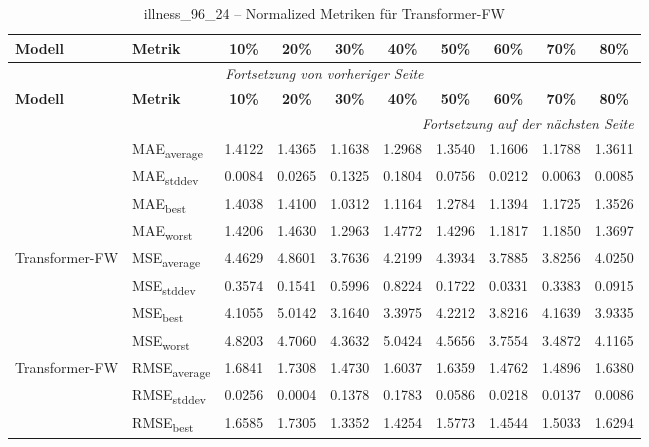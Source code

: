 {\small
\begin{longtable}{l l c c c c c c c c}
    \toprule
    \textbf{Modell} & \textbf{Metrik} & \textbf{10\%} & \textbf{20\%} & \textbf{30\%} & \textbf{40\%} & \textbf{50\%} & \textbf{60\%} & \textbf{70\%} & \textbf{80\%} \\
    \midrule
    \endfirsthead
    \multicolumn{10}{c}{\textit{Fortsetzung von vorheriger Seite}} \\
    \toprule
    \textbf{Modell} & \textbf{Metrik} & \textbf{10\%} & \textbf{20\%} & \textbf{30\%} & \textbf{40\%} & \textbf{50\%} & \textbf{60\%} & \textbf{70\%} & \textbf{80\%} \\
    \midrule
    \endhead
    \midrule
    \multicolumn{10}{r}{\textit{Fortsetzung auf der nächsten Seite}} \\
    \midrule
    \endfoot
    \bottomrule
    \caption{illness_96_24 -- Normalized Metriken für Transformer-FW}
    \label{tab:illness_96_24_normalized_transformer-fw}
    \endlastfoot
\multirow{4}{*}{Transformer-FW} & MAE\textsubscript{average} & 1.4122 & 1.4365 & 1.1638 & 1.2968 & 1.3540 & 1.1606 & 1.1788 & 1.3611 \\
 & MAE\textsubscript{stddev} & 0.0084 & 0.0265 & 0.1325 & 0.1804 & 0.0756 & 0.0212 & 0.0063 & 0.0085 \\
 & MAE\textsubscript{best} & 1.4038 & 1.4100 & 1.0312 & 1.1164 & 1.2784 & 1.1394 & 1.1725 & 1.3526 \\
 & MAE\textsubscript{worst} & 1.4206 & 1.4630 & 1.2963 & 1.4772 & 1.4296 & 1.1817 & 1.1850 & 1.3697 \\
\cmidrule(lr){2-10}
\multirow{4}{*}{Transformer-FW} & MSE\textsubscript{average} & 4.4629 & 4.8601 & 3.7636 & 4.2199 & 4.3934 & 3.7885 & 3.8256 & 4.0250 \\
 & MSE\textsubscript{stddev} & 0.3574 & 0.1541 & 0.5996 & 0.8224 & 0.1722 & 0.0331 & 0.3383 & 0.0915 \\
 & MSE\textsubscript{best} & 4.1055 & 5.0142 & 3.1640 & 3.3975 & 4.2212 & 3.8216 & 4.1639 & 3.9335 \\
 & MSE\textsubscript{worst} & 4.8203 & 4.7060 & 4.3632 & 5.0424 & 4.5656 & 3.7554 & 3.4872 & 4.1165 \\
\cmidrule(lr){2-10}
\multirow{4}{*}{Transformer-FW} & RMSE\textsubscript{average} & 1.6841 & 1.7308 & 1.4730 & 1.6037 & 1.6359 & 1.4762 & 1.4896 & 1.6380 \\
 & RMSE\textsubscript{stddev} & 0.0256 & 0.0004 & 0.1378 & 0.1783 & 0.0586 & 0.0218 & 0.0137 & 0.0086 \\
 & RMSE\textsubscript{best} & 1.6585 & 1.7305 & 1.3352 & 1.4254 & 1.5773 & 1.4544 & 1.5033 & 1.6294 \\

\end{longtable}}
